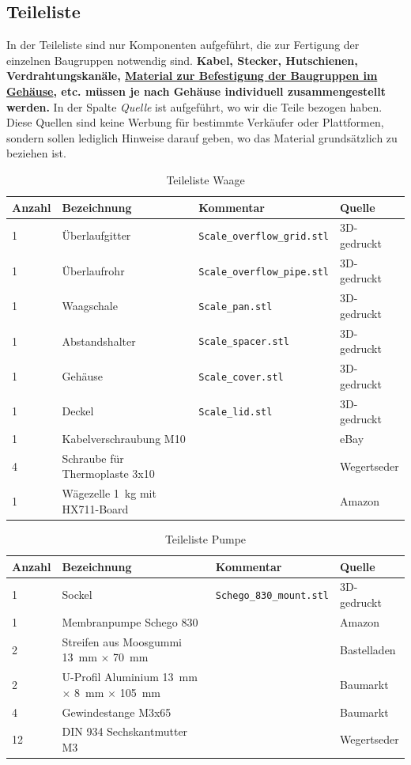 \documentclass[a4paper]{scrartcl}
\begin{document}
\FloatBarrier
\subsection{Teileliste}
In der Teileliste sind nur Komponenten aufgeführt, die zur Fertigung der einzelnen Baugruppen notwendig sind. \textbf{Kabel, Stecker, Hutschienen, Verdrahtungskanäle, \uline{Material zur Befestigung der Baugruppen im Gehäuse}, etc. müssen je nach Gehäuse individuell zusammengestellt werden.} In der Spalte \textit{Quelle} ist aufgeführt, wo wir die Teile bezogen haben. Diese Quellen sind keine Werbung für bestimmte Verkäufer oder Plattformen, sondern sollen lediglich Hinweise darauf geben, wo das Material grundsätzlich zu beziehen ist.

\begin{table}
\caption{Teileliste Waage}
\begin{tabular}{|l|l|l|l|}
\hline
Anzahl & Bezeichnung & Kommentar & Quelle\\
\hline
1 & Überlaufgitter & \texttt{Scale\_overflow\_grid.stl} & 3D-gedruckt \\
\hline 
1 & Überlaufrohr & \texttt{Scale\_overflow\_pipe.stl} & 3D-gedruckt\\
\hline 
1 & Waagschale & \texttt{Scale\_pan.stl} & 3D-gedruckt\\
\hline
1 & Abstandshalter & \texttt{Scale\_spacer.stl} & 3D-gedruckt\\
\hline
1 & Gehäuse & \texttt{Scale\_cover.stl} & 3D-gedruckt \\
\hline 
1 & Deckel & \texttt{Scale\_lid.stl} & 3D-gedruckt\\
\hline 
1 & Kabelverschraubung M10&  & eBay\\
\hline 
4 & Schraube für Thermoplaste 3x10& & Wegertseder\\
\hline
1 & Wägezelle \SI{1}{\kilo\gram} mit HX711-Board & &Amazon\\
\hline
\end{tabular}
\end{table}

\begin{table}
\caption{Teileliste Pumpe}
\begin{tabular}{|l|l|l|l|}
\hline
Anzahl & Bezeichnung & Kommentar & Quelle\\
\hline
1 & Sockel & \texttt{Schego\_830\_mount.stl} & 3D-gedruckt \\
\hline
1 & Membranpumpe Schego 830 & &Amazon\\
\hline 
2 & Streifen aus Moosgummi \SI{13}{\milli\metre} $\times$ \SI{70}{\milli\metre} & & Bastelladen \\
\hline
2 & U-Profil Aluminium \SI{13}{\milli\metre} $\times$ \SI{8}{\milli\metre} $\times$ \SI{105}{\milli\metre} & & Baumarkt\\
\hline 
4 & Gewindestange M3x65 & & Baumarkt\\
\hline
12 & DIN 934 Sechskantmutter M3 & & Wegertseder\\
\hline


\end{tabular}
\end{table}
\end{document}
